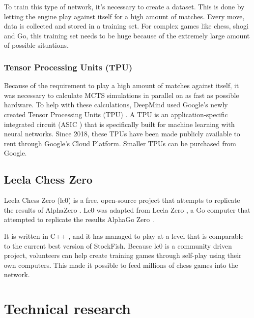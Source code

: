\documentclass{article}
\begin{document}
To train this type of network, it's necessary to create a dataset. 
This is done by letting the engine play against itself for a high amount of matches. 
Every move, data is collected and stored in a training set.
For complex games like chess, shogi and Go, this training set needs to be huge
because of the extremely large amount of possible situations.



\subsubsection{Tensor Processing Units (TPU)}

Because of the requirement to play a high amount of matches against itself, it was necessary to calculate
MCTS simulations in parallel on as fast as possible hardware. 
To help with these calculations, DeepMind used Google's newly created Tensor Processing Units (TPU) \cite{TensorProcessingUnit2022}.
A TPU is an application-specific integrated circuit (ASIC \cite{ApplicationspecificIntegratedCircuit2022}) that is specifically built for machine learning with
neural networks. Since 2018, these TPUs have been made publicly available to rent through Google's Cloud Platform. Smaller TPUs 
can be purchased from Google. 

\subsection{Leela Chess Zero}

Leela Chess Zero (lc0) is a free, open-source project that attempts to replicate the results of AlphaZero \cite{LeelaChessZero2022}. 
Lc0 was adapted from Leela Zero \cite{LeelaZero2021}, a Go computer that attempted to replicate the results AlphaGo Zero \cite{AlphaGoZero2022}. 

It is written in C++ \cite{Lc02022}, and it has managed to play at a level that is comparable to the current best version of StockFish.
Because lc0 is a community driven project, volunteers can help create training games through self-play using their own computers.
This made it possible to feed millions of chess games into the network. 

\newpage
\section{Technical research}

\end{document}
